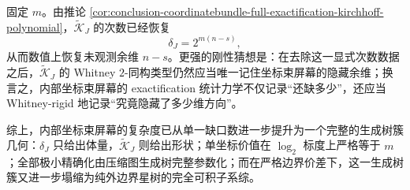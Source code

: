 \begin{conjecture}\label{conj:conclusion-coordinatebundle-kirchhoff-codimension-whitney-rigidity}
固定 \(m\)。由推论 \ref{cor:conclusion-coordinatebundle-full-exactification-kirchhoff-polynomial}，\(\widetilde{\mathcal K}_J\) 的次数已经恢复
\[
\delta_J=2^{m(n-s)},
\]
从而数值上恢复未观测余维 \(n-s\)。更强的刚性猜想是：在去除这一显式次数数据之后，\(\widetilde{\mathcal K}_J\) 的 Whitney \(2\)-同构类型仍然应当唯一记住坐标束屏幕的隐藏余维；换言之，内部坐标束屏幕的 exactification 统计力学不仅记录“还缺多少”，还应当 Whitney-rigid 地记录“究竟隐藏了多少维方向”。
\end{conjecture}

\noindent
综上，内部坐标束屏幕的复杂度已从单一缺口数进一步提升为一个完整的生成树簇几何：\(\delta_J\) 只给出体量，\(\widetilde{\mathcal K}_J\) 则给出形状；单坐标价值在 \(\log_2\) 标度上严格等于 \(m\)；全部极小精确化由压缩图生成树完整参数化；而在严格边界价差下，这一生成树簇又进一步塌缩为纯外边界星树的完全可积子系综。

\endinput
